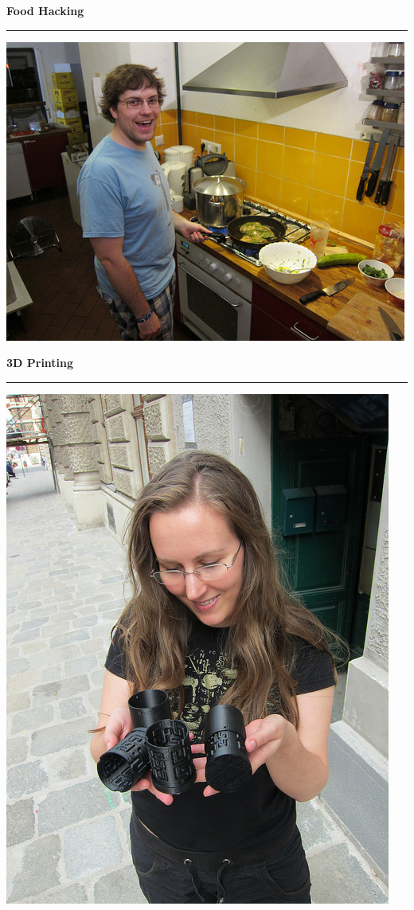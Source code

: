\documentclass{seminar}
\providecommand{\T}[1]{
	\begin{center}
		{\bf #1}
	\end{center}
	\vspace{2mm}
	\hrule
	\vspace{2mm}
}
\begin{document}
\begin{slide}
	\T{Food Hacking}
	\begin{center}
		\includegraphics[scale=0.5]{food_hacking.jpeg}
	\end{center}
\end{slide}

\begin{slide}
	\T{3D Printing}
	\begin{center}
		\includegraphics[scale=0.7]{3d-printing.jpeg}
	\end{center}
\end{slide}
\end{document}
